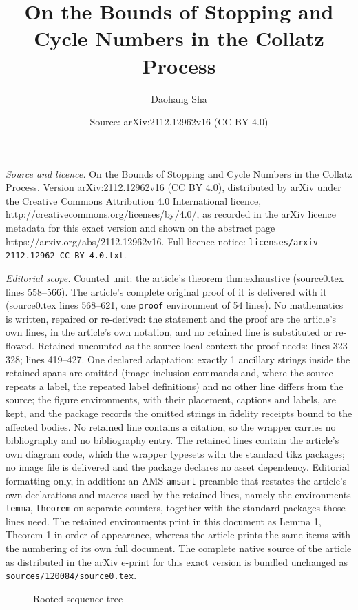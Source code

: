 \documentclass[10pt,a4paper]{amsart}
\title{On the Bounds of Stopping and Cycle Numbers in the Collatz Process}
\author{Daohang Sha}
\date{Source: arXiv:2112.12962v16 (CC BY 4.0)}
\begin{document}
\maketitle

\noindent\emph{Source and licence.} On the Bounds of Stopping and Cycle Numbers in the Collatz Process. Version arXiv:2112.12962v16 (CC BY 4.0), distributed by arXiv under the Creative Commons Attribution 4.0 International licence, http://creativecommons.org/licenses/by/4.0/, as recorded in the arXiv licence metadata for this exact version and shown on the abstract page https://arxiv.org/abs/2112.12962v16. Full licence notice: \texttt{licenses/arxiv-2112.12962-CC-BY-4.0.txt}.\par\smallskip

\noindent\textit{Editorial scope.} Counted unit: the article's theorem thm:exhaustive (source0.tex lines 558--566). The article's complete original proof of it is delivered with it (source0.tex lines 568--621, one \texttt{proof} environment of 54 lines). No mathematics is written, repaired or re-derived: the statement and the proof are the article's own lines, in the article's own notation, and no retained line is substituted or re-flowed.  Retained uncounted as the source-local context the proof needs: lines 323--328; lines 419--427.  One declared adaptation: exactly 1 ancillary strings inside the retained spans are omitted (image-inclusion commands and, where the source repeats a label, the repeated label definitions) and no other line differs from the source; the figure environments, with their placement, captions and labels, are kept, and the package records the omitted strings in fidelity receipts bound to the affected bodies.  No retained line contains a citation, so the wrapper carries no bibliography and no bibliography entry.  The retained lines contain the article's own diagram code, which the wrapper typesets with the standard tikz packages; no image file is delivered and the package declares no asset dependency.  Editorial formatting only, in addition: an AMS \texttt{amsart} preamble that restates the article's own declarations and macros used by the retained lines, namely the environments \texttt{lemma}, \texttt{theorem} on separate counters, together with the standard packages those lines need.  The retained environments print in this document as Lemma 1, Theorem 1 in order of appearance, whereas the article prints the same items with the numbering of its own full document.  The complete native source of the article as distributed in the arXiv e-print for this exact version is bundled unchanged as \texttt{sources/120084/source0.tex}.
	\begin{figure}[ht]
		\centering
		
		\caption{Rooted sequence tree}
		\label{fig:seqtree}
	\end{figure}
\end{document}
